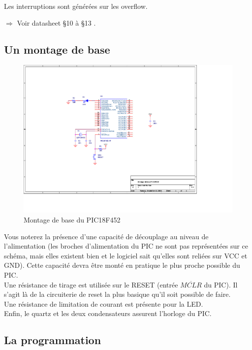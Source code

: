 \documentclass[a4paper]{article}
\begin{document}
Les interruptions sont générées sur les overflow.

$\Rightarrow$ Voir datasheet §10 à §13 \cite{PIC18FXX2}.

\subsection{Un montage de base}

\begin{figure}[H]
	\centering
	\includegraphics[scale=1.00]{Images/Montage_base_PIC18F452}
	\caption{Montage de base du PIC18F452
		\label{Montage_base_PIC18F452}}
\end{figure}

Vous noterez la présence d'une capacité de découplage au niveau de l'alimentation (les broches d'alimentation du PIC ne sont pas représentées sur ce schéma, mais elles existent bien et le logiciel sait qu'elles sont reliées sur VCC et GND). Cette capacité devra être monté en pratique le plus proche possible du PIC.\\
Une résistance de tirage est utilisée sur le RESET (entrée $\overline{MCLR}$ du PIC). Il s'agit là de la circuiterie de reset la plus basique qu'il soit possible de faire.\\
Une résistance de limitation de courant est présente pour la \ac{LED}.\\
Enfin, le quartz et les deux condensateurs assurent l'horloge du PIC.

\subsection{La programmation}
\end{document}
